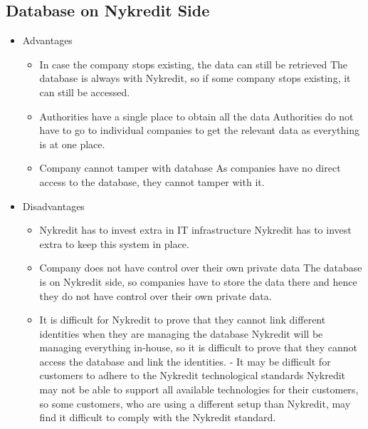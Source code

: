 \subsection{Database on Nykredit Side}
\begin{itemize}
\item Advantages
\begin{itemize}
\item In case the company stops existing, the data can still be retrieved
The database is always with Nykredit, so if some company stops existing, it can still be accessed.
\item Authorities have a single place to obtain all the data
Authorities do not have to go to individual companies to get the relevant data as everything is at one place.
\item Company cannot tamper with database
As companies have no direct access to the database, they cannot tamper with it.
\end{itemize}
\end{itemize}
\begin{itemize}
\item Disadvantages
\begin{itemize}
\item Nykredit has to invest extra in IT infrastructure
Nykredit has to invest extra to keep this system in place.
\item Company does not have control over their own private data
The database is on Nykredit side, so companies have to store the data there and hence they do not have control over their own private data.
\item It is difficult for Nykredit to prove that they cannot link different identities when they are managing the database
Nykredit will be managing everything in-house, so it is difficult to prove that they cannot access the database and link the identities.
-	It may be difficult for customers to adhere to the Nykredit technological standards
Nykredit may not be able to support all available technologies for their customers, so some customers, who are using a different setup than Nykredit, may find it difficult to comply with the Nykredit standard.
\end{itemize}
\end{itemize}

